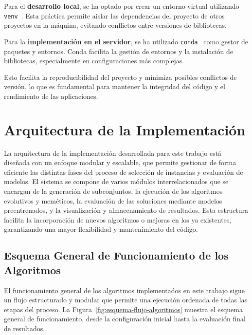 Para el \textbf{desarrollo local}, se ha optado por crear un entorno virtual utilizando
\texttt{venv}~\cite{CreationVirtualEnvironments}.
Esta práctica permite aislar las dependencias del proyecto de otros proyectos en la máquina, evitando conflictos entre
versiones de bibliotecas.


Para la \textbf{implementación en el servidor}, se ha utilizado \texttt{conda}~\cite{CondaDocumentation} como gestor
de paquetes y entornos.
Conda facilita la gestión de entornos y la instalación de bibliotecas, especialmente en configuraciones más complejas.



Esto facilita la reproducibilidad del proyecto y minimiza posibles conflictos de versión, lo que es fundamental para
mantener la integridad del código y el rendimiento de las aplicaciones.

\section{Arquitectura de la Implementación}\label{sec:arquitectura-de-la-implementacion}
La arquitectura de la implementación desarrollada para este trabajo está diseñada con un enfoque modular y escalable,
que permite gestionar de forma eficiente las distintas fases del proceso de selección de instancias y evaluación de modelos.
El sistema se compone de varios módulos interrelacionados que se encargan de la generación de subconjuntos,
la ejecución de los algoritmos evolutivos y meméticos, la evaluación de las soluciones mediante modelos preentrenados, y la visualización y almacenamiento de resultados.
Esta estructura facilita la incorporación de nuevos algoritmos o mejoras en los ya existentes, garantizando una mayor flexibilidad y mantenimiento del código.

\subsection{Esquema General de Funcionamiento de los Algoritmos}\label{subsec:esquema-algoritmos}
El funcionamiento general de los algoritmos implementados en este trabajo sigue un flujo estructurado y modular que permite una ejecución ordenada de todas las etapas del proceso.
La Figura~\ref{fig:esquema-flujo-algoritmos} muestra el esquema general de funcionamiento, desde la configuración inicial hasta la evaluación final de resultados.

